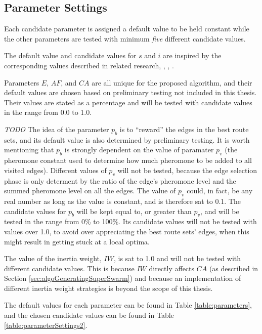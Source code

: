 \subsection{Parameter Settings}
\label{subsec:parameterSettings_setup}
Each candidate parameter is assigned a default value to be held constant while the other parameters are tested with minimum \textit{five} different candidate values. 

The default value and candidate values for $s$ and $i$ are inspired by the corresponding values described in related research\citep{salehi-nezhad07}, \citep{poorzahedy11}, \citep{sedighpour14}, \citep{kechagiopoulos14}.

Parameters $E$, $AF$, and $CA$ are all unique for the proposed algorithm, and their default values are chosen based on preliminary testing not included in this thesis. Their values are stated as a percentage and will be tested with candidate values in the range from 0.0 to 1.0. %

\emph{\color{blue}TODO}
The idea of the parameter $p_b$ is to ``reward'' the edges in the best route sets, and its default value is also determined by preliminary testing. It is worth mentioning that $p_ b$ is strongly dependent on the value of paramater $p_v$ (the pheromone constant used to determine how much pheromone to be added to all visited edges). Different values of $p_v$ will not be tested, because the edge selection phase is only determent by the ratio of the edge's pheromone level and the summed pheromone level on all the edges. The value of $p_v$ could, in fact, be any real number as long as the value is constant, and is therefore sat to 0.1. The candidate values for $p_b$ will be kept equal to, or greater than $p_v$, and will be tested in the range from 0\% to 100\%. Its candidate values will not be tested with values over 1.0, to avoid over appreciating the best route sets' edges, when this might result in getting stuck at a local optima.

The value of the inertia weight, $IW$, is sat to 1.0 and will not be tested with different candidate values. This is because $IW$ directly affects $CA$ (as described in Section \vref{sec:algoGeneratingSuperSwarm}) and because an implementation of different inertia weight strategies is beyond the scope of this thesis. 

The default values for each parameter can be found in Table \vref{table:parameters}, and the chosen candidate values can be found in Table \vref{table:parameterSettings2}.

